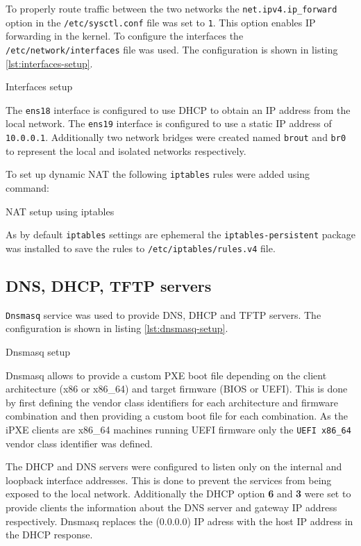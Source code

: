 \documentclass[../main.tex]{subfiles}
\begin{document}
To properly route traffic between the two networks the \texttt{net.ipv4.ip\_forward} option in the \texttt{/etc/sysctl.conf} file was set to \texttt{1}.
This option enables IP forwarding in the kernel.
To configure the interfaces the \texttt{/etc/network/interfaces} file was used. The configuration is shown in listing \ref{lst:interfaces-setup}.

\begin{listing}[H]
  \caption{Interfaces setup}
  \label{lst:interfaces-setup}
\end{listing}

The \texttt{ens18} interface is configured to use DHCP to obtain an IP address from the local network. The \texttt{ens19} interface is configured to use a static IP address of \texttt{10.0.0.1}.
Additionally two network bridges were created named \texttt{brout} and \texttt{br0} to represent the local and isolated networks respectively.

To set up dynamic NAT the following \texttt{iptables} rules were added using command:

\begin{listing}[H]
  \caption{NAT setup using iptables}
\end{listing}

As by default \texttt{iptables} settings are ephemeral the \texttt{iptables-persistent} package was installed to save the rules to \texttt{/etc/iptables/rules.v4} file.

\subsection{DNS, DHCP, TFTP servers}

\texttt{Dnsmasq} service was used to provide DNS, DHCP and TFTP servers. The configuration is shown in listing \ref{lst:dnsmasq-setup}.

\begin{listing}[H]
  \caption{Dnsmasq setup}
  \label{lst:dnsmasq-setup}
\end{listing}

Dnsmasq allows to provide a custom PXE boot file depending on the client architecture (x86 or x86\_64) and target firmware (BIOS or UEFI).
This is done by first defining the vendor class identifiers for each architecture and firmware combination and then providing a custom boot file for each combination.
As the iPXE clients are x86\_64 machines running UEFI firmware only the \texttt{UEFI x86\_64} vendor class identifier was defined.

The DHCP and DNS servers were configured to listen only on the internal and loopback interface addresses. This is done to prevent the services from being exposed to the local network.
Additionally the DHCP option \textbf{6} and \textbf{3} were set to provide clients the information about the DNS server and gateway IP address respectively.
Dnsmasq replaces the (0.0.0.0) IP adress with the host IP address in the DHCP response.
\end{document}
